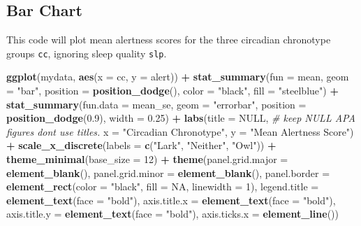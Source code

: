 \documentclass[
]{book}
\newenvironment{Shaded}{\begin{snugshade}}{\end{snugshade}}
\newcommand{\AttributeTok}[1]{\textcolor[rgb]{0.13,0.29,0.53}{#1}}
\newcommand{\CommentTok}[1]{\textcolor[rgb]{0.56,0.35,0.01}{\textit{#1}}}
\newcommand{\ConstantTok}[1]{\textcolor[rgb]{0.56,0.35,0.01}{#1}}
\newcommand{\DecValTok}[1]{\textcolor[rgb]{0.00,0.00,0.81}{#1}}
\newcommand{\FloatTok}[1]{\textcolor[rgb]{0.00,0.00,0.81}{#1}}
\newcommand{\FunctionTok}[1]{\textcolor[rgb]{0.13,0.29,0.53}{\textbf{#1}}}
\newcommand{\NormalTok}[1]{#1}
\newcommand{\SpecialCharTok}[1]{\textcolor[rgb]{0.81,0.36,0.00}{\textbf{#1}}}
\newcommand{\StringTok}[1]{\textcolor[rgb]{0.31,0.60,0.02}{#1}}
\let\oldsubsection\subsection
\renewcommand{\subsection}{\needspace{3\baselineskip}\oldsubsection}  %
\begin{document}
\subsection{Bar Chart}\label{bar-chart-1}

This code will plot mean alertness scores for the three circadian chronotype groups \texttt{cc}, ignoring sleep quality \texttt{slp}.

\begin{Shaded}
\begin{Highlighting}[]
\FunctionTok{ggplot}\NormalTok{(mydata, }\FunctionTok{aes}\NormalTok{(}\AttributeTok{x =}\NormalTok{ cc, }\AttributeTok{y =}\NormalTok{ alert)) }\SpecialCharTok{+}
  \FunctionTok{stat\_summary}\NormalTok{(}\AttributeTok{fun =}\NormalTok{ mean, }\AttributeTok{geom =} \StringTok{"bar"}\NormalTok{,}
               \AttributeTok{position =} \FunctionTok{position\_dodge}\NormalTok{(), }\AttributeTok{color =} \StringTok{"black"}\NormalTok{,}
               \AttributeTok{fill =} \StringTok{"steelblue"}\NormalTok{) }\SpecialCharTok{+}
  \FunctionTok{stat\_summary}\NormalTok{(}\AttributeTok{fun.data =}\NormalTok{ mean\_se, }\AttributeTok{geom =} \StringTok{"errorbar"}\NormalTok{, }
               \AttributeTok{position =} \FunctionTok{position\_dodge}\NormalTok{(}\FloatTok{0.9}\NormalTok{), }\AttributeTok{width =} \FloatTok{0.25}\NormalTok{) }\SpecialCharTok{+}
  \FunctionTok{labs}\NormalTok{(}\AttributeTok{title =} \ConstantTok{NULL}\NormalTok{,   }\CommentTok{\# keep NULL APA figures don\textquotesingle{}t use titles.}
       \AttributeTok{x =} \StringTok{"Circadian Chronotype"}\NormalTok{,  }
       \AttributeTok{y =} \StringTok{"Mean Alertness Score"}\NormalTok{) }\SpecialCharTok{+}
  \FunctionTok{scale\_x\_discrete}\NormalTok{(}\AttributeTok{labels =} \FunctionTok{c}\NormalTok{(}\StringTok{"Lark"}\NormalTok{, }\StringTok{"Neither"}\NormalTok{, }\StringTok{"Owl"}\NormalTok{)) }\SpecialCharTok{+}
  \FunctionTok{theme\_minimal}\NormalTok{(}\AttributeTok{base\_size =} \DecValTok{12}\NormalTok{) }\SpecialCharTok{+}
  \FunctionTok{theme}\NormalTok{(}\AttributeTok{panel.grid.major =} \FunctionTok{element\_blank}\NormalTok{(),}
        \AttributeTok{panel.grid.minor =} \FunctionTok{element\_blank}\NormalTok{(),}
        \AttributeTok{panel.border =} \FunctionTok{element\_rect}\NormalTok{(}\AttributeTok{color =} \StringTok{"black"}\NormalTok{, }\AttributeTok{fill =} \ConstantTok{NA}\NormalTok{, }\AttributeTok{linewidth =} \DecValTok{1}\NormalTok{),}
        \AttributeTok{legend.title =} \FunctionTok{element\_text}\NormalTok{(}\AttributeTok{face =} \StringTok{"bold"}\NormalTok{),}
        \AttributeTok{axis.title.x =} \FunctionTok{element\_text}\NormalTok{(}\AttributeTok{face =} \StringTok{"bold"}\NormalTok{),}
        \AttributeTok{axis.title.y =} \FunctionTok{element\_text}\NormalTok{(}\AttributeTok{face =} \StringTok{"bold"}\NormalTok{),}
        \AttributeTok{axis.ticks.x =} \FunctionTok{element\_line}\NormalTok{())}
\end{Highlighting}
\end{Shaded}
\end{document}
